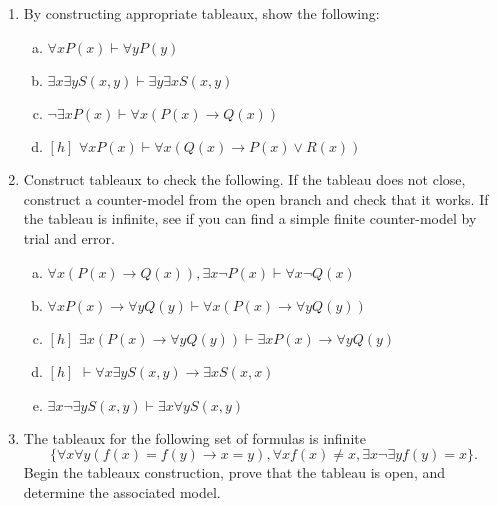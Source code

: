 	\begin{enumerate}[\thesection.1]
	
		\item By constructing appropriate tableaux, show the following:

			\begin{enumerate}[(a)]

				\item $\forall xP(x)\vdash \forall yP(y)$

				\item $\exists x\exists yS(x,y)\vdash \exists y\exists xS(x,y)$

				\item $\neg \exists xP(x)\vdash \forall x(P(x)\to Q(x))$

				\item $[h]$ $\forall xP(x)\vdash \forall x(Q(x)\to P(x)\lor R(x))$

			\end{enumerate}
			
			\item Construct tableaux to check the following. If the tableau does not close, construct a counter-model from the open branch and check that it works. If the tableau is infinite, see if you can find a simple finite counter-model by trial and error.

				\begin{enumerate}[(a)]

					\item $\forall x(P(x)\to Q(x)), \exists x\neg P(x)\vdash \forall x\neg Q(x)$

					\item $\forall xP(x)\to \forall yQ(y)\vdash \forall x(P(x)\to \forall yQ(y))$

					\item $[h]$ $\exists x(P(x)\to \forall yQ(y))\vdash \exists xP(x)\to \forall yQ(y)$

					\item $[h]$ $\vdash \forall x\exists yS(x,y)\to \exists xS(x,x)$

					\item $\exists x\neg\exists yS(x,y)\vdash \exists x\forall yS(x,y)$

				\end{enumerate}
				
			\item The tableaux for the following set of formulas is infinite  \[\{\forall x\forall y(f(x)=f(y)\to x=y),  \forall xf(x)\neq x, \exists x\neg\exists yf(y)=x\}.\] Begin the tableaux construction, prove that the tableau is open, and determine the associated model. 			
				

\end{enumerate}
